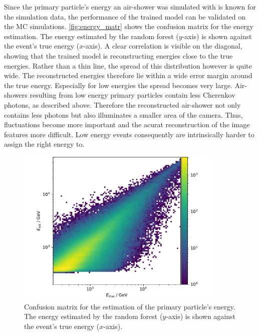 Since the primary particle's energy an air-shower was simulated with is known
for the simulation data, the performance of the trained model can be
validated on the MC simulations. \autoref{fig:energy_matr} shows the confusion
matrix for the energy estimation. The energy estimated by the random forest
($y$-axis) is shown against the event's true energy ($x$-axis). A clear
correlation is visible on the diagonal, showing that the trained model is
reconstructing energies close to the true energies. Rather than a thin line,
the spread of this distribution however is quite wide. The reconstructed
energies therefore lie within a wide error margin around the true energy.
Especially for low energies the spread becomes very large. Air-showers
resulting from low energy primary particles contain less Cherenkov photons, as
described above. Therefore the reconstructed air-shower not only contains less
photons but also illuminates a smaller area of the camera. Thus, fluctuations
become more important and the acurat reconstruction of the image features more
difficult. Low energy events consequently are intrinsically harder to assign
the right energy to.
%
\begin{figure}
  \centering
  \includegraphics[width=0.9\textwidth]{Plots/results/DBSCAN/energy_migration.pdf}
  \caption{Confusion matrix for the estimation of the primary particle's energy. The energy estimated by the random forest ($y$-axis) is shown against the event's true energy ($x$-axis).}
  \label{fig:energy_matr}
\end{figure}
%
%
